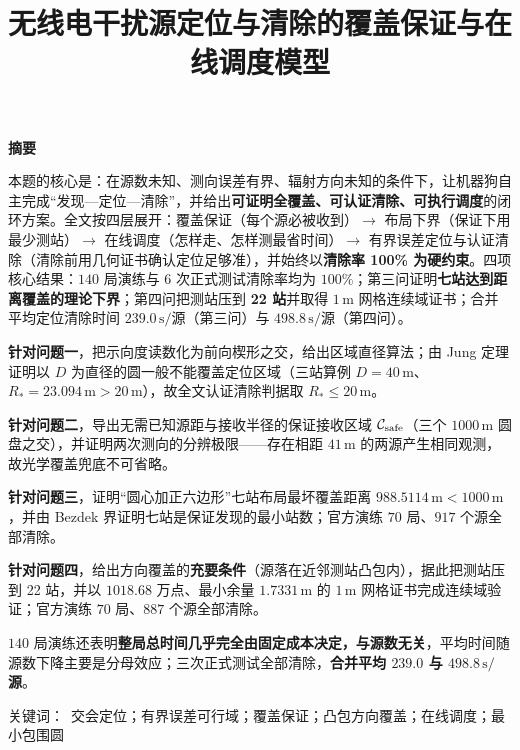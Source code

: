 \documentclass[withoutpreface,bwprint]{cumcmthesis}
\title{无线电干扰源定位与清除的覆盖保证与在线调度模型}
\makeatletter
\renewcommand{\mcm@cap@keywordsname}{关键词}
\newcommand{\mecr}{R_{*}}
\newcommand{\msec}{\,\mathrm{s}}
\newcommand{\mmet}{\,\mathrm{m}}
\renewcommand{\abstractname}{摘要}
\renewenvironment{abstract}{%
  \begin{center}{\zihao{4}\bfseries\abstractname}\end{center}%
  \quotation}
  {\endquotation\newpage\null}
\renewcommand\keywords[1]{%
  \par\vspace{\baselineskip}%
  {\noindent\zihao{-4}\heiti\mcm@cap@keywordsname：}~{#1}}
\makeatother
\begin{document}
\maketitle

\begin{abstract}
本题的核心是：在源数未知、测向误差有界、辐射方向未知的条件下，让机器狗自主完成“发现—定位—清除”，并给出\textbf{可证明全覆盖、可认证清除、可执行调度}的闭环方案。全文按四层展开：覆盖保证（每个源必被收到）$\to$ 布局下界（保证下用最少测站）$\to$ 在线调度（怎样走、怎样测最省时间）$\to$ 有界误差定位与认证清除（清除前用几何证书确认定位足够准），并始终以\textbf{清除率 100\% 为硬约束}。四项核心结果：$140$ 局演练与 $6$ 次正式测试清除率均为 $100\%$；第三问证明\textbf{七站达到距离覆盖的理论下界}；第四问把测站压到 \textbf{22 站}并取得 $1\mmet$ 网格连续域证书；合并平均定位清除时间 $239.0\msec/$源（第三问）与 $498.8\msec/$源（第四问）。

\textbf{针对问题一}，把示向度读数化为前向楔形之交，给出区域直径算法；由 Jung 定理证明以 $D$ 为直径的圆一般不能覆盖定位区域（三站算例 $D=40\mmet$、$\mecr=23.094\mmet>20\mmet$），故全文认证清除判据取 $\mecr\le20\mmet$。

\textbf{针对问题二}，导出无需已知源距与接收半径的保证接收区域 $\mathcal C_{\rm safe}$（三个 $1000\mmet$ 圆盘之交），并证明两次测向的分辨极限——存在相距 $41\mmet$ 的两源产生相同观测，故光学覆盖兜底不可省略。

\textbf{针对问题三}，证明“圆心加正六边形”七站布局最坏覆盖距离 $988.5114\mmet<1000\mmet$，并由 Bezdek 界证明七站是保证发现的最小站数；官方演练 $70$ 局、$917$ 个源全部清除。

\textbf{针对问题四}，给出方向覆盖的\textbf{充要条件}（源落在近邻测站凸包内），据此把测站压到 22 站，并以 $1018.68$ 万点、最小余量 $1.7331\mmet$ 的 $1\mmet$ 网格证书完成连续域验证；官方演练 $70$ 局、$887$ 个源全部清除。

$140$ 局演练还表明\textbf{整局总时间几乎完全由固定成本决定，与源数无关}，平均时间随源数下降主要是分母效应；三次正式测试全部清除，\textbf{合并平均 $239.0$ 与 $498.8\msec/$源}。

\keywords{交会定位；有界误差可行域；覆盖保证；凸包方向覆盖；在线调度；最小包围圆}
\end{abstract}
\end{document}
